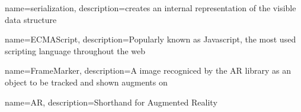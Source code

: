 {
	name=serialization,
	description={creates an internal representation of the visible data 
  				structure}
}

{
	name=ECMAScript,
	description={Popularly known as Javascript, the most used scripting
				language throughout the web}
}

{
	name=FrameMarker,
	description={A image recogniced by the AR library as an object to be tracked and shown augments on}
}

{
	name=AR,
	description={Shorthand for Augmented Reality}
}
